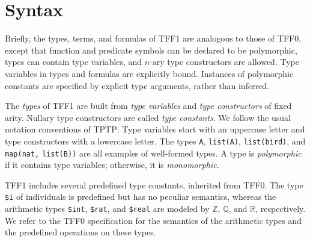 \section{Syntax} \label{sec_syntax}

Briefly, the types, terms, and formulas of TFF1 are analogous to those of TFF0,
except that function and predicate symbols can be declared to be polymorphic,
types can contain type variables, and $n$-ary type constructors are allowed.
Type variables in types and formulas are explicitly bound. Instances of
polymorphic constants are specified by explicit type arguments, rather than
inferred.

 The {\em types\/} of TFF1 are built from {\em type
variables\/} and {\em type constructors\/} of fixed arity. Nullary type
constructors are called {\em type constants}. We follow the usual notation
conventions of TPTP\@: Type variables start with an uppercase letter and type
constructors with a lowercase letter. The types \verb+A+, \verb+list(A)+,
\verb+list(bird)+, and \verb+map(nat,+ \verb+list(B))+ are all examples of
well-formed types. A type is {\em polymorphic} if it contains type variables;
otherwise, it is {\em monomorphic}.


TFF1 includes several predefined type constants, inherited from TFF0.
The type {\tt \$i} %
of individuals is predefined but has no peculiar semantics, whereas the
arithmetic types
{\tt \$int}, {\tt \$rat}, and {\tt \$real} are modeled by $\mathbb{Z}$,
$\mathbb{Q}$, and $\mathbb{R}$, respectively. We refer
to the TFF0 specification \cite{TFF0} for the semantics of
the arithmetic types and the predefined operations on
these types. %

